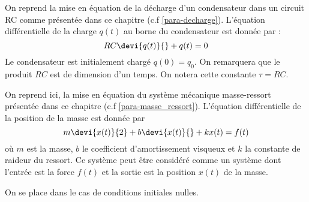 On reprend la mise en équation de la décharge d'un condensateur 
dans un circuit RC comme présentée dans ce chapitre 
(c.f \cref{para-decharge}). L'équation différentielle
de la charge $q(t)$ au borne du condensateur est donnée par :
\[
    RC\devi{q(t)}{}+q(t)=0
\]
Le condensateur est initialement chargé $q(0)=q_0$. On remarquera que le 
produit $RC$ est de dimension d'un temps. On notera cette constante $\tau=RC$.
\begin{marginfigure}
    \centering
    
\end{marginfigure}

\clearpage
On reprend ici, la mise en équation du système mécanique masse-ressort 
présentée dans ce chapitre (c.f \cref{para-masse_ressort}). L'équation 
différentielle de la position de la masse est donnée par 
\[
m\devi{x(t)}{2}+b\devi{x(t)}{}+kx(t)=f(t)
\]
où $m$ est la masse, $b$ le coefficient d'amortissement visqueux et $k$ la
constante de raideur du ressort. Ce système peut être considéré comme
un système dont l'entrée est la force $f(t)$ et la sortie est la position
$x(t)$ de la masse.
\begin{marginfigure}
    \centering
    
\end{marginfigure}
On se place dans le cas de conditions initiales nulles. 


